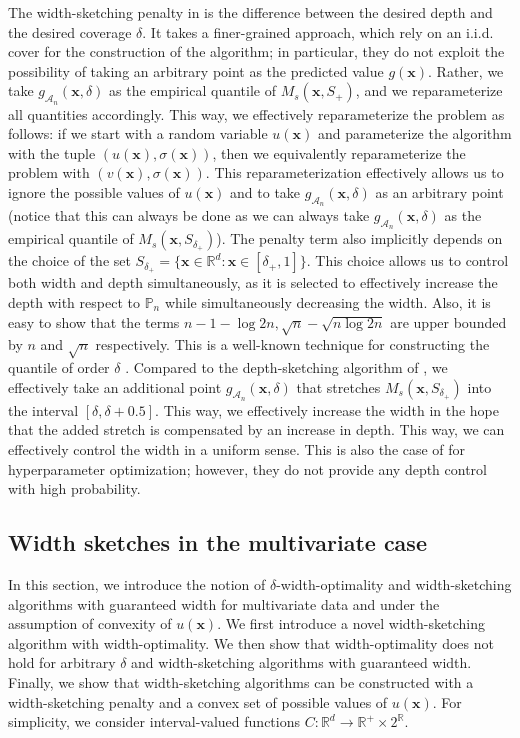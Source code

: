 \documentclass{article} %
\theoremstyle{remark}
\theoremstyle{definition}      %
\begin{document}
The width-sketching penalty in  is the difference between the desired depth and the desired coverage $\delta$. It takes a finer-grained approach, which rely on an i.i.d. cover for the construction of the algorithm; in particular, they do not exploit the possibility of taking an arbitrary point as the predicted value $g(\bm{x})$. Rather, we take $g_{\mathcal{A}_n}(\bm{x},\delta)$ as the empirical quantile of $M_s(\bm{x},S_+)$, and we reparameterize all quantities accordingly. This way, we effectively reparameterize the problem as follows: if we start with a random variable $u(\bm{x})$ and parameterize the algorithm with the tuple $(u(\bm{x}),\sigma(\bm{x}))$, then we equivalently reparameterize the problem with $(v(\bm{x}),\sigma(\bm{x}))$. 
This reparameterization effectively allows us to ignore the possible values of $u(\bm{x})$ and to take $g_{\mathcal{A}_n}(\bm{x},\delta)$ as an arbitrary point (notice that this can always be done as we can always take  $g_{\mathcal{A}_n}(\bm{x},\delta)$ as the empirical quantile of $M_s(\bm{x},S_{\delta_+})$). 
The penalty term also implicitly depends on the choice of the set $S_{\delta_+} = \{\bm{x} \in \mathbb{R}^d : \bm{x} \in [\delta_+,1]\}$. This choice allows us to control both width and depth simultaneously, as it is selected to effectively increase the depth with respect to $\mathbb{P}_n$ while simultaneously decreasing the width. Also, it is easy to show that the terms $n - 1 - \log 2n, \sqrt{n} - \sqrt{n \log 2n}$ are upper bounded by $n$ and $\sqrt{n}$ respectively. This is a well-known technique for constructing the quantile of order $\delta$ \cite[see, e.g.,][]{wilks1941determination}. Compared to the depth-sketching algorithm of \cite{angelopoulos2024conformal}, we effectively take an additional point $g_{\mathcal{A}_n}(\bm{x},\delta)$ that stretches $M_s(\bm{x},S_{\delta_+})$ into the interval $[\delta,\delta+0.5]$. This way, we effectively increase the width in the hope that the added stretch is compensated by an increase in depth. This way, we can effectively control the width in a uniform sense. This is also the case of \cite{farzaneh2024quantile} for hyperparameter optimization; however, they do not provide any depth control with high probability. 
\subsection{Width sketches in the multivariate case}  \label{sec:convex}
In this section, we introduce the notion of $\delta$-width-optimality and width-sketching algorithms with guaranteed width for multivariate data and under the assumption of convexity of $u(\bm{x})$. 
We first introduce a novel width-sketching algorithm with width-optimality. 
We then show that width-optimality does not hold for arbitrary $\delta$ and width-sketching algorithms with guaranteed width.
Finally, we show that width-sketching algorithms can be constructed with a width-sketching penalty and a convex set of possible values of $u(\bm{x})$. 
For simplicity, we consider interval-valued functions $C: \mathbb{R}^d \rightarrow \mathbb{R}^+ \times 2^{\mathbb{R}}$.
\end{document}
